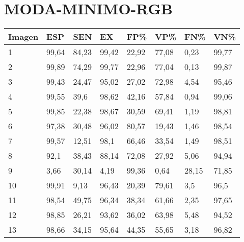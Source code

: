 \section{MODA-MINIMO-RGB}
\begin{longtable}[c]{|l|l|l|l|l|l|l|l|}
\hline
\textbf{Imagen} & \textbf{ESP} & \textbf{SEN} & \textbf{EX} & \textbf{FP\%} & \textbf{VP\%} & \textbf{FN\%} & \textbf{VN\%} \\ \hline
\endfirsthead
%
\endhead
%
1               & 99,64        & 84,23        & 99,42       & 22,92         & 77,08         & 0,23          & 99,77         \\ \hline
2               & 99,89        & 74,29        & 99,77       & 22,96         & 77,04         & 0,13          & 99,87         \\ \hline
3               & 99,43        & 24,47        & 95,02       & 27,02         & 72,98         & 4,54          & 95,46         \\ \hline
4               & 99,55        & 39,6         & 98,62       & 42,16         & 57,84         & 0,94          & 99,06         \\ \hline
5               & 99,85        & 22,38        & 98,67       & 30,59         & 69,41         & 1,19          & 98,81         \\ \hline
6               & 97,38        & 30,48        & 96,02       & 80,57         & 19,43         & 1,46          & 98,54         \\ \hline
7               & 99,57        & 12,51        & 98,1        & 66,46         & 33,54         & 1,49          & 98,51         \\ \hline
8               & 92,1         & 38,43        & 88,14       & 72,08         & 27,92         & 5,06          & 94,94         \\ \hline
9               & 3,66         & 30,14        & 4,19        & 99,36         & 0,64          & 28,15         & 71,85         \\ \hline
10              & 99,91        & 9,13         & 96,43       & 20,39         & 79,61         & 3,5           & 96,5          \\ \hline
11              & 98,54        & 49,75        & 96,34       & 38,34         & 61,66         & 2,35          & 97,65         \\ \hline
12              & 98,85        & 26,21        & 93,62       & 36,02         & 63,98         & 5,48          & 94,52         \\ \hline
13              & 98,66        & 34,15        & 95,64       & 44,35         & 55,65         & 3,18          & 96,82         \\ \hline

\end{longtable}
